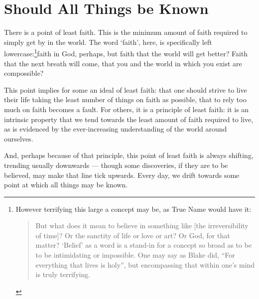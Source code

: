 \section*{Should All Things be Known}

There is a point of least faith. This is the minimum amount of faith required to simply get by in the world. The word `faith', here, is specifically left lowercase:\footnote{However terrifying this large a concept may be, as True Name would have it:

\begin{quote}
But what does it mean to believe in something like {[}the irreversibility of time{]}? Or the sanctity of life or love or art? Or God, for that matter? `Belief' as a word is a stand-in for a concept so broad as to be to be intimidating or impossible. One may say as Blake did, ``For everything that lives is holy'', but encompassing that within one’s mind is truly terrifying.

\parencite{mitzvot}
\end{quote}}faith in God, perhaps, but faith that the world will get better? Faith that the next breath will come, that you and the world in which you exist are compossible?

This point implies for some an ideal of least faith: that one should strive to live their life taking the least number of things on faith as possible, that to rely too much on faith becomes a fault. For others, it is a principle of least faith: it is an intrinsic property that we tend towards the least amount of faith required to live, as is evidenced by the ever-increasing understanding of the world around ourselves.

And, perhaps because of that principle, this point of least faith is always shifting, trending usually downwards --- though some discoveries, if they are to be believed, may make that line tick upwards. Every day, we drift towards some point at which all things may be known.


